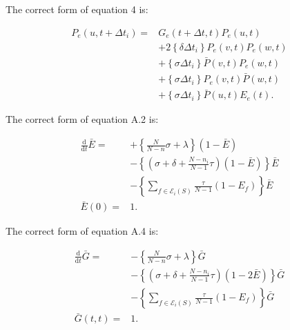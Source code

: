 \documentclass[preprint, 
superscriptaddress,aip,author-year]{revtex4-1}
\begin{document}
\renewcommand{\theequation}{A\arabic{equation}}
\addtocounter{equation}{+1}

The correct form of equation 4 is:

\begin{align}
 P_e (u,t+\Delta t_i) =& G_e (t+\Delta t,t ) P_e(u,t) \label{Pe}
 \nonumber \\
& +2 \left\{\delta \Delta t_i \right\} P_e(v,t) P_e(w,t) \nonumber \\
& +\left\{\sigma \Delta t_i \right\} \bar P(v,t) P_e(w,t)\nonumber \\
& +\left\{\sigma \Delta t_i \right\} P_e(v,t) \bar P(w,t)\nonumber \\
& +\left\{\sigma \Delta t_i \right\} \bar P(u,t) E_e(t). \nonumber 
\end{align}

The correct form of equation A.2 is:

\begin{align}
\frac{\mathrm{d}}{\mathrm{d} t} {\bar E} = &+\left\{ \frac{N}{N-n}
  \sigma + \lambda \right\} (1-\bar E ) \label{bare}  \nonumber\\
&- \left\{ ( \sigma + \delta + \frac{N-n_i}{N-1}\tau ) (1-\bar E ) \right\} \bar E \nonumber\\
& - \left\{ \sum_{f \in \mathcal{E}_i(S) } \frac{\tau}{N-1} (1-E_f) \right\}\bar E \nonumber\\
 \bar E(0)=&1. \nonumber 
 \end{align}

\addtocounter{equation}{+1}

The correct form of equation A.4 is:

\begin{align}
 \frac{\mathrm{d}}{\mathrm{d} t} \bar G = & - \left\{ \frac{N}{N-n}
   \sigma + \lambda \right\} \bar G \label{barg}  \nonumber\\ 
& - \left\{ (\sigma + \delta + \frac{N-n_i}{N-1}\tau) (1-2\bar E )\right\} \bar G \nonumber\\ 
& - \left\{ \sum_{f \in \mathcal{E}_i(S) } \frac{\tau}{N-1} (1-E_f) \right\} \bar G \nonumber \\ 
\bar G(t,t) = & 1. \nonumber 
\end{align}




 
\end{document}

